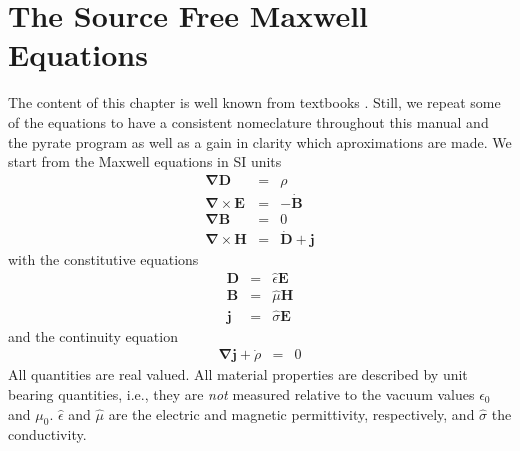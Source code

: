 \documentclass[12pt,a4paper,twoside,openright,BCOR10mm,headsepline,titlepage,abstracton,chapterprefix,final]{scrreprt}
\newcommand\Vector[1]{{\mathbf{#1}}}
\newcommand\vacuum{0}
\newcommand\Nabla{\Vector{\nabla}}
\newcommand\timederivative[1]{\dot{{#1}}}
\newcommand\Tensor[1]{\hat{#1}}
\newcommand\scalarEfield{E}
\newcommand\scalarBfield{B}
\newcommand\scalarHfield{H}
\newcommand\scalarDfield{D}
\newcommand\Efield{\Vector{\scalarEfield}}
\newcommand\Bfield{\Vector{\scalarBfield}}
\newcommand\Hfield{\Vector{\scalarHfield}}
\newcommand\Dfield{\Vector{\scalarDfield}}
\newcommand\permeability{\Tensor{\mu}}
\newcommand\vacuumpermeability{\mu_{\vacuum}}
\newcommand\permittivity{\Tensor{\epsilon}}
\newcommand\vacuumpermittivity{\epsilon_{\vacuum}}
\newcommand\conductivity{\Tensor{\sigma}}
\newcommand\currentdensity{\Vector{j}}
\newcommand\chargedensity{\rho}
\begin{document}
\section{The Source Free Maxwell Equations}
The content of this chapter is well known from textbooks \cite{Jackson}. Still, we repeat some of the equations to have a consistent nomeclature throughout this manual and the pyrate program
as well as a gain in clarity which aproximations are made.
We start from the Maxwell equations in SI units
\begin{subequations}\label{eq:Maxwell}
\begin{eqnarray}
  \Nabla \Dfield &=& \chargedensity 							\label{eq:MaxwellNablaD}\\
  \Nabla \times \Efield &=& - \timederivative{\Bfield}  					\label{eq:MaxwellNablaCrossE}\\
  \Nabla \Bfield &=& 0  									\label{eq:MaxwellNablaB}\\
  \Nabla \times \Hfield &=& \timederivative{\Dfield} + \currentdensity  		\label{eq:MaxwellNablaCrossH}
\end{eqnarray}
\end{subequations}
with the constitutive equations
\begin{subequations}\label{eq:Material}
\begin{eqnarray}
  \Dfield &=& \permittivity \Efield 								\label{eq:ConstitutiveEpsilon}\\
  \Bfield &=& \permeability \Hfield 								\label{eq:ConstitutiveMu}\\
  \currentdensity &=& \conductivity \Efield						\label{eq:ConstitutiveSigma}
\end{eqnarray}
\end{subequations}
and the continuity equation
\begin{eqnarray}
  \Nabla \currentdensity + \timederivative{\chargedensity} &=& 0		\label{eq:continuity}
\end{eqnarray}
All quantities are real valued.
All material properties are described by unit bearing quantities, i.e., they are \emph{not} measured relative to the vacuum values $\vacuumpermittivity$ and $\vacuumpermeability$. $\permittivity$ and $\permeability$ are the electric and magnetic permittivity, respectively, and $\conductivity$ the conductivity. 
\end{document}
